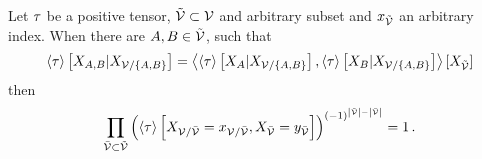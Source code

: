 \begin{lemma}
    \label{lem:independentContractionFactorization}
    Let $\tau$ be a positive tensor, $\tilde{\mathcal{V}}\subset\mathcal{V}$ and arbitrary subset and $x_{\tilde{\mathcal{V}}}$ an arbitrary index.
    When there are $A,B \in\tilde{\mathcal{V}}$, such that
    \begin{align*}
        \left\langle \tau\right\rangle \left[ X_{A,B} | X_{\mathcal{V}/\{A,B\}} \right]
        = \left\langle 
            \left\langle \tau\right\rangle \left[ X_{A} | X_{\mathcal{V}/\{A,B\}} \right],
            \left\langle \tau\right\rangle \left[ X_{B} | X_{\mathcal{V}/\{A,B\}} \right]
        \right\rangle \left[ X_{\tilde{\mathcal{V}}} \right]
    \end{align*}
    then
    \begin{align*}
        \prod_{\bar{\mathcal{V}}\subset\tilde{\mathcal{V}}}
        \left(\left\langle \tau\right\rangle \left[ X_{\mathcal{V}/\bar{\mathcal{V}}}=x_{\mathcal{V}/\bar{\mathcal{V}}}, X_{\bar{\mathcal{V}}} = y_{\bar{\mathcal{V}}} \right]\right)^{(-1)^{\left|\tilde{\mathcal{V}}\right|-\left|\bar{\mathcal{V}}\right|}} = 1 \, .
    \end{align*}
\end{lemma}
